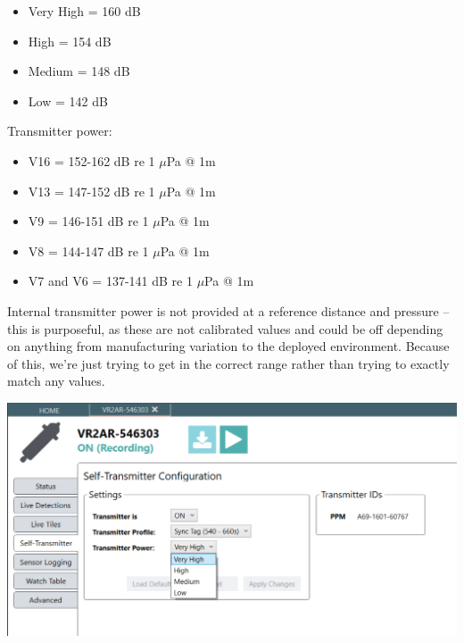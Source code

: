 \documentclass[
  letterpaper,
  DIV=11,
  numbers=noendperiod]{scrreprt}
\providecommand{\tightlist}{%
  \setlength{\itemsep}{0pt}\setlength{\parskip}{0pt}}\usepackage{longtable,booktabs,array}
\begin{document}
\begin{itemize}
\tightlist
\item
  Very High = 160 dB
\item
  High = 154 dB
\item
  Medium = 148 dB
\item
  Low = 142 dB
\end{itemize}

Transmitter power:

\begin{itemize}
\tightlist
\item
  V16 = 152-162 dB re 1 \(\mu\)Pa @ 1m
\item
  V13 = 147-152 dB re 1 \(\mu\)Pa @ 1m
\item
  V9 = 146-151 dB re 1 \(\mu\)Pa @ 1m
\item
  V8 = 144-147 dB re 1 \(\mu\)Pa @ 1m
\item
  V7 and V6 = 137-141 dB re 1 \(\mu\)Pa @ 1m
\end{itemize}

\begin{tcolorbox}[enhanced jigsaw, title=\textcolor{quarto-callout-note-color}{\faInfo}\hspace{0.5em}{Note}, leftrule=.75mm, colback=white, colframe=quarto-callout-note-color-frame, opacityback=0, toptitle=1mm, titlerule=0mm, colbacktitle=quarto-callout-note-color!10!white, toprule=.15mm, left=2mm, bottomtitle=1mm, arc=.35mm, breakable, coltitle=black, rightrule=.15mm, bottomrule=.15mm, opacitybacktitle=0.6]

Internal transmitter power is not provided at a reference distance and
pressure -- this is purposeful, as these are not calibrated values and
could be off depending on anything from manufacturing variation to the
deployed environment. Because of this, we're just trying to get in the
correct range rather than trying to exactly match any values.

\end{tcolorbox}

\includegraphics{images/fathom/self_transmitter_power.png}
\end{document}
